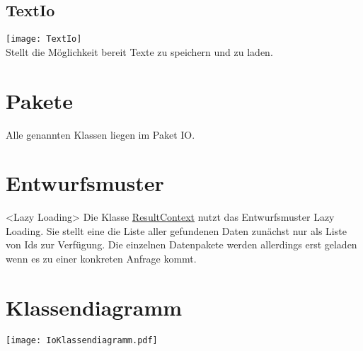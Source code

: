 \subsection{TextIo}\label{IO:TextIo}
\texttt{[image: TextIo]}\\
Stellt die Möglichkeit bereit Texte zu speichern und zu laden.
\beginMembers
{}
\closeMembers

\section{Pakete}
Alle genannten Klassen liegen im Paket IO.
\section{Entwurfsmuster}
<Lazy Loading>
Die Klasse \hyperref[IO:ResultContext]{ResultContext} nutzt das Entwurfsmuster Lazy Loading. Sie stellt eine die Liste aller gefundenen Daten zunächst nur als Liste von Ids zur Verfügung. Die einzelnen Datenpakete werden allerdings erst geladen wenn es zu einer konkreten Anfrage kommt.

\section{Klassendiagramm}
\texttt{[image: IoKlassendiagramm.pdf]}
